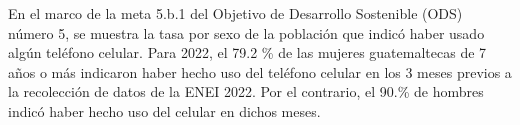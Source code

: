 En el marco de la meta 5.b.1 del Objetivo de Desarrollo Sostenible (ODS) número 5, se muestra la tasa por sexo de la población que indicó haber usado algún teléfono celular. Para 2022, el 79.2 \% de las mujeres guatemaltecas de 7 años o más indicaron haber hecho uso del teléfono celular en los 3 meses previos a la recolección de datos de la ENEI 2022. Por el contrario, el 90.\% de hombres indicó haber hecho uso del celular en dichos meses. 
